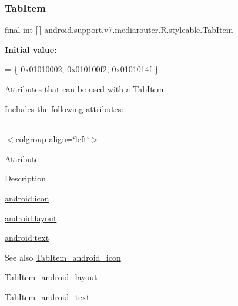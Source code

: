 \subsubsection{\texorpdfstring{Tab\+Item}{TabItem}}
{\footnotesize\ttfamily final int \mbox{[}$\,$\mbox{]} android.\+support.\+v7.\+mediarouter.\+R.\+styleable.\+Tab\+Item\hspace{0.3cm}{\ttfamily [static]}}

{\bfseries Initial value\+:}
\begin{DoxyCode}
= \{
            0x01010002, 0x010100f2, 0x0101014f
        \}
\end{DoxyCode}
Attributes that can be used with a Tab\+Item. 

Includes the following attributes\+:

\tabulinesep=1mm
\begin{longtabu} spread 0pt [c]{*{0}{|X[-1]}|}
\hline
\end{longtabu}
$<$colgroup align=\char`\"{}left\char`\"{}$>$ 

Attribute

Description 

{\ttfamily \hyperlink{classandroid_1_1support_1_1v7_1_1mediarouter_1_1R_1_1styleable_a93a215dbebe4252257e23a87bda5e437}{android\+:icon}}

{\ttfamily \hyperlink{classandroid_1_1support_1_1v7_1_1mediarouter_1_1R_1_1styleable_ab26423c3d2e3799635d79f5769bef517}{android\+:layout}}

{\ttfamily \hyperlink{classandroid_1_1support_1_1v7_1_1mediarouter_1_1R_1_1styleable_a01c4895e66e7032ad11121089c0b602b}{android\+:text}}

\begin{DoxySeeAlso}{See also}
\hyperlink{classandroid_1_1support_1_1v7_1_1mediarouter_1_1R_1_1styleable_a93a215dbebe4252257e23a87bda5e437}{Tab\+Item\+\_\+android\+\_\+icon} 

\hyperlink{classandroid_1_1support_1_1v7_1_1mediarouter_1_1R_1_1styleable_ab26423c3d2e3799635d79f5769bef517}{Tab\+Item\+\_\+android\+\_\+layout} 

\hyperlink{classandroid_1_1support_1_1v7_1_1mediarouter_1_1R_1_1styleable_a01c4895e66e7032ad11121089c0b602b}{Tab\+Item\+\_\+android\+\_\+text} 
\end{DoxySeeAlso}
\mbox{\label{classandroid_1_1support_1_1v7_1_1mediarouter_1_1R_1_1styleable_a93a215dbebe4252257e23a87bda5e437}} 
